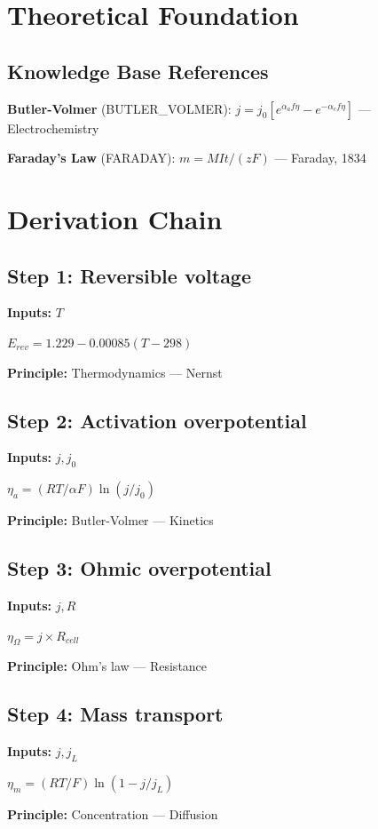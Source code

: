 \documentclass[11pt,twocolumn]{article}
\begin{document}
\section{Theoretical Foundation}

\subsection{Knowledge Base References}
\textbf{Butler-Volmer} (BUTLER_VOLMER): $j = j_0[e^{\alpha_a f\eta} - e^{-\alpha_c f\eta}]$ --- Electrochemistry

\textbf{Faraday's Law} (FARADAY): $m = MIt/(zF)$ --- Faraday, 1834


\section{Derivation Chain}

\subsection*{Step 1: Reversible voltage}
\textbf{Inputs:} $T$

$E_{rev} = 1.229 - 0.00085(T-298)$

\textbf{Principle:} Thermodynamics --- Nernst

\subsection*{Step 2: Activation overpotential}
\textbf{Inputs:} $j, j_0$

$\eta_a = (RT/\alpha F)\ln(j/j_0)$

\textbf{Principle:} Butler-Volmer --- Kinetics

\subsection*{Step 3: Ohmic overpotential}
\textbf{Inputs:} $j, R$

$\eta_\Omega = j \times R_{cell}$

\textbf{Principle:} Ohm's law --- Resistance

\subsection*{Step 4: Mass transport}
\textbf{Inputs:} $j, j_L$

$\eta_m = (RT/F)\ln(1-j/j_L)$

\textbf{Principle:} Concentration --- Diffusion
\end{document}
